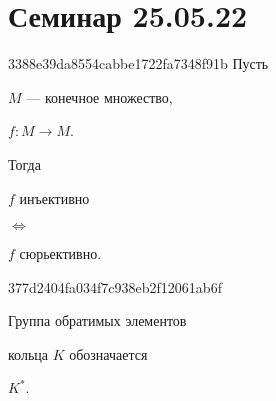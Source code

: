 \section{Семинар 25.05.22}
\begin{note}{3388e39da8554cabbe1722fa7348f91b}
    Пусть \begin{icloze}{4}\({ M }\) --- конечное множество,\end{icloze}\: \begin{icloze}{5}\({ f : M \to M }\).\end{icloze}
    Тогда
    \begin{center}
        \begin{icloze}{3}\({ f }\) инъективно\end{icloze} \begin{icloze}{1}\({ \iff }\)\end{icloze} \begin{icloze}{2}\({ f }\) сюрьективно.\end{icloze}
    \end{center}
\end{note}

\begin{note}{377d2404fa034f7c938eb2f12061ab6f}
    \begin{icloze}{2}Группа обратимых элементов\end{icloze} кольца \({ K }\) обозначается \begin{icloze}{1}\({ K^* }\).\end{icloze}
\end{note}



